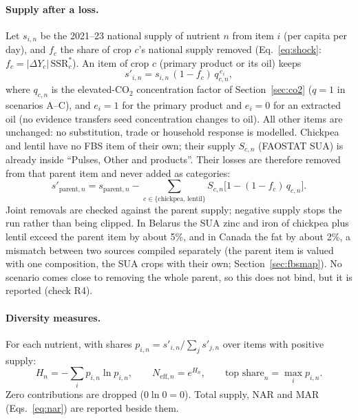\paragraph{Supply after a loss.} Let $s_{i,n}$ be the 2021--23 national supply of nutrient $n$ from item $i$ (per
capita per day), and $f_c$ the share of crop $c$'s national supply removed (Eq.~\ref{eq:shock}: $f_c =
|\Delta Y_c|\,\text{SSR}^{*}_c$). An item of crop $c$ (primary product or its oil) keeps
\begin{equation}\label{eq:divitem}
s'_{i,n}=s_{i,n}\,(1-f_{c})\,q_{c,n}^{\,e_i},
\end{equation}
where $q_{c,n}$ is the elevated-CO$_2$ concentration factor of Section~\ref{sec:co2} ($q=1$ in scenarios A--C), and
$e_i=1$ for the primary product and $e_i=0$ for an extracted oil (no evidence transfers seed concentration changes
to oil). All other items are unchanged: no substitution, trade or household response is
modelled. Chickpea and lentil have no FBS item of their own; their supply $S_{c,n}$ (FAOSTAT SUA) is already inside
``Pulses, Other and products''. Their losses are therefore removed from that parent item and never added as
categories:
\begin{equation}\label{eq:divparent}
s'_{\text{parent},n}=s_{\text{parent},n}-\sum_{c\in\{\text{chickpea, lentil}\}} S_{c,n}\bigl[1-(1-f_c)\,q_{c,n}\bigr].
\end{equation}
Joint removals are checked against the parent supply; negative supply stops the run rather than being clipped.
In Belarus the SUA zinc and iron of chickpea plus lentil exceed the parent item by about 5\%, and in Canada the fat by
about 2\%, a mismatch between two sources compiled separately (the parent item is valued with one composition, the SUA
crops with their own; Section~\ref{sec:fbsmap}). No scenario comes close to removing the whole parent, so this does not bind, but it is
reported (check R4).

\paragraph{Diversity measures.} For each nutrient, with shares $p_{i,n}=s'_{i,n}/\sum_j s'_{j,n}$ over items with
positive supply:
\begin{equation}\label{eq:divH}
H_n=-\sum_i p_{i,n}\ln p_{i,n},\qquad N_{\text{eff},n}=e^{H_n},\qquad \text{top share}_n=\max_i p_{i,n}.
\end{equation}
Zero contributions are dropped ($0\ln0=0$). Total supply, NAR and MAR (Eqs.~\ref{eq:nar}) are reported beside them.

